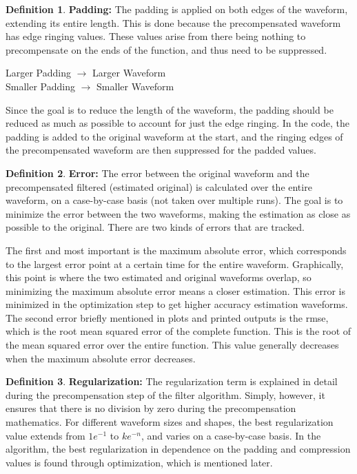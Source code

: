 \documentclass[11pt, a4paper]{article}
\theoremstyle{definition}
\newtheorem{definition}{Definition}[section]
\numberwithin{equation}{section}
\begin{document}
\begin{definition}
     \textbf{Padding:} The padding is applied on both edges of the waveform, extending its entire length. This is done because the precompensated waveform has edge ringing values. These values arise from there being nothing to precompensate on the ends of the function, and thus need to be suppressed. 
    \begin{center}
        Larger Padding $\rightarrow$ Larger Waveform \\
        Smaller Padding $\rightarrow$ Smaller Waveform
    \end{center}
\end{definition}
Since the goal is to reduce the length of the waveform, the padding should be reduced as much as possible to account for just the edge ringing. In the code, the padding is added to the original waveform at the start, and the ringing edges of the precompensated waveform are then suppressed for the padded values.

\begin{definition}
     \textbf{Error:} The error between the original waveform and the precompensated filtered (estimated original) is calculated over the entire waveform, on a case-by-case basis (not taken over multiple runs). The goal is to minimize the error between the two waveforms, making the estimation as close as possible to the original. There are two kinds of errors that are tracked. 
     
     The first and most important is the maximum absolute error, which corresponds to the largest error point at a certain time for the entire waveform. Graphically, this point is where the two estimated and original waveforms overlap, so minimizing the maximum absolute error means a closer estimation. This error is minimized in the optimization step to get higher accuracy estimation waveforms.
\\
     The second error briefly mentioned in plots and printed outputs is the rmse, which is the root mean squared error of the complete function. This is the root of the mean squared error over the entire function. This value generally decreases when the maximum absolute error decreases.
\end{definition}

\begin{definition}
    \textbf{Regularization:} The regularization term is explained in detail during the precompensation step of the filter algorithm. Simply, however, it ensures that there is no division by zero during the precompensation mathematics. For different waveform sizes and shapes, the best regularization value extends from $1e^{-1}$ to $ke^{-n}$, and varies on a case-by-case basis. In the algorithm, the best regularization in dependence on the padding and compression values is found through optimization, which is mentioned later.
\end{definition}
\end{document}
